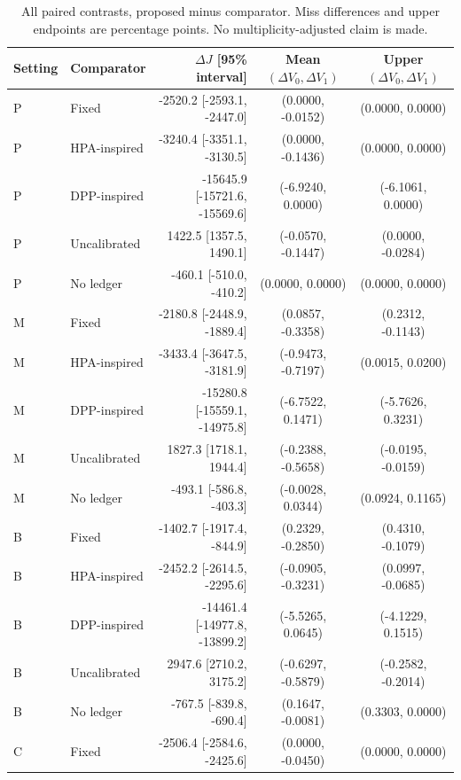 \documentclass{IEEEoj}
\renewcommand{\arraystretch}{1.15}
\begin{document}
\begin{table}[!htbp]\centering\fontsize{8}{9}\selectfont\renewcommand{\arraystretch}{1.06}
\caption{All paired contrasts, proposed minus comparator. Miss differences and upper endpoints are percentage points. No multiplicity-adjusted claim is made.}\label{tab:allpaired}
\begin{tabular}{llrcc}
\toprule Setting & Comparator & $\Delta J$ [95\% interval] & Mean $(\Delta V_0,\Delta V_1)$ & Upper $(\Delta V_0,\Delta V_1)$\\\midrule
P & Fixed & -2520.2 [-2593.1, -2447.0] & (0.0000, -0.0152) & (0.0000, 0.0000) \\
P & HPA-inspired & -3240.4 [-3351.1, -3130.5] & (0.0000, -0.1436) & (0.0000, 0.0000) \\
P & DPP-inspired & -15645.9 [-15721.6, -15569.6] & (-6.9240, 0.0000) & (-6.1061, 0.0000) \\
P & Uncalibrated & 1422.5 [1357.5, 1490.1] & (-0.0570, -0.1447) & (0.0000, -0.0284) \\
P & No ledger & -460.1 [-510.0, -410.2] & (0.0000, 0.0000) & (0.0000, 0.0000) \\
\addlinespace
M & Fixed & -2180.8 [-2448.9, -1889.4] & (0.0857, -0.3358) & (0.2312, -0.1143) \\
M & HPA-inspired & -3433.4 [-3647.5, -3181.9] & (-0.9473, -0.7197) & (0.0015, 0.0200) \\
M & DPP-inspired & -15280.8 [-15559.1, -14975.8] & (-6.7522, 0.1471) & (-5.7626, 0.3231) \\
M & Uncalibrated & 1827.3 [1718.1, 1944.4] & (-0.2388, -0.5658) & (-0.0195, -0.0159) \\
M & No ledger & -493.1 [-586.8, -403.3] & (-0.0028, 0.0344) & (0.0924, 0.1165) \\
\addlinespace
B & Fixed & -1402.7 [-1917.4, -844.9] & (0.2329, -0.2850) & (0.4310, -0.1079) \\
B & HPA-inspired & -2452.2 [-2614.5, -2295.6] & (-0.0905, -0.3231) & (0.0997, -0.0685) \\
B & DPP-inspired & -14461.4 [-14977.8, -13899.2] & (-5.5265, 0.0645) & (-4.1229, 0.1515) \\
B & Uncalibrated & 2947.6 [2710.2, 3175.2] & (-0.6297, -0.5879) & (-0.2582, -0.2014) \\
B & No ledger & -767.5 [-839.8, -690.4] & (0.1647, -0.0081) & (0.3303, 0.0000) \\
\addlinespace
C & Fixed & -2506.4 [-2584.6, -2425.6] & (0.0000, -0.0450) & (0.0000, 0.0000) \\

\end{tabular}
\end{table}
\end{document}
